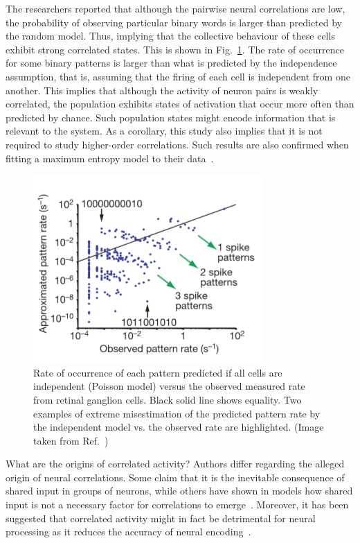 \documentclass[11pt,letterpaper]{article}
\begin{document}
        The researchers reported that although the pairwise neural correlations
        are low, the probability of observing particular binary words is larger
        than predicted by the random model. Thus, implying that the collective
        behaviour of these cells exhibit strong correlated states.
        This is shown in Fig.~\ref{fig3}.
        The rate of occurrence for some binary patterns is larger than what is
        predicted by the independence assumption, that is, assuming that
        the firing of each cell is independent from one another.
        This implies that although the activity of neuron pairs is weakly
        correlated, the population exhibits states of activation that
        occur more often than predicted by chance.
        Such population states might encode information that is relevant
        to the system.
        As a corollary, this study also implies that it is not required to
        study higher-order correlations.
        Such results are also confirmed when fitting a maximum entropy
        model to their data~\cite{schneidman2006weak,schneidman2003network}.

 		\begin{figure}[t]
			\centering
			\includegraphics[scale=0.75]{Schneidman4.png}
			\caption{
			    Rate of occurrence of each pattern predicted if all
			    cells are independent (Poisson model) versus the observed
			    measured rate from retinal ganglion cells.
			    Black solid line shows equality.
			    Two examples of extreme misestimation of the predicted pattern
			    rate by the independent model vs. the observed rate are highlighted.
			    (Image taken from Ref.~\cite{schneidman2006weak})
			}
			\label{fig3}
		\end{figure} 
        
        What are the origins of correlated activity?
        Authors differ regarding the alleged origin of neural correlations.
        Some claim that it is the inevitable consequence of shared input in
        groups of neurons, while others have shown in models how shared input
        is not a necessary factor for correlations to 
        emerge~\cite{renart2010asynchronous,ecker2010decorrelated}.
        Moreover, it has been suggested that correlated activity might in
        fact be detrimental for neural processing as it reduces the
        accuracy of neural encoding~\cite{renart2010asynchronous}.
        
\end{document}
